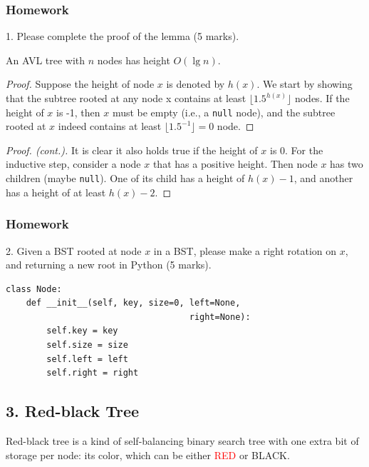 \documentclass[aspectratio=169, 14pt]{beamer}
\begin{document}
\begin{frame}
    \frametitle{Homework}
1. Please complete the proof of the lemma (5 marks).
  \begin{lemma}
    An AVL tree with $n$ nodes has height $O(\lg{n})$. 
    \end{lemma} 
    \begin{proof}
    Suppose the height of node $x$ is denoted by $h(x)$. We start by showing that \alert{the subtree rooted at any node x contains at least $\lfloor 1.5^{h(x)} \rfloor$ nodes}. If the height of $x$ is -1, then $x$ must be empty (i.e., a \texttt{null} node), and the subtree rooted at $x$ indeed contains at least $\lfloor 1.5^{-1} \rfloor = 0$ node.
    \end{proof}
    \end{frame}
    
    \begin{frame}
        \begin{proof}[Proof. (cont.)]
            It is clear it also holds true if the height of $x$ is 0. For the inductive step, consider a node $x$ that has a positive height. Then node $x$ has two children (maybe \texttt{null}). One of its child has a height of $h(x)-1$, and another has a height of at least $h(x) - 2$. 
            
            \end{proof}
    \end{frame}

\begin{frame}[fragile]
    \frametitle{Homework}
2. Given a BST rooted at node $x$ in a BST, please make a right rotation on $x$, and returning a new root in Python (5 marks).

\begin{verbatim}
class Node:
    def __init__(self, key, size=0, left=None, 
                                    right=None):
        self.key = key
        self.size = size
        self.left = left
        self.right = right
\end{verbatim}
\end{frame}

\begin{frame}

    \section{\textcolor{darkmidnightblue}{3. Red-black Tree}} 
    Red-black tree is a kind of self-balancing binary search tree with one extra bit of storage per node: its color, which can be either \textcolor{red}{RED} or BLACK. 
\end{frame}
\end{document}

